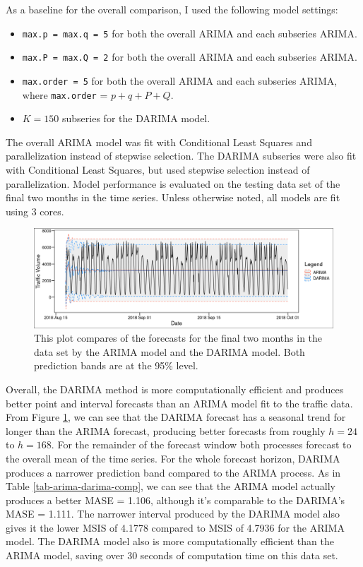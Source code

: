 \documentclass[
]{article}
\begin{document}
As a baseline for the overall comparison, I used the following model settings:
\begin{itemize}
  \item \texttt{max.p = max.q = 5} for both the overall ARIMA and each subseries ARIMA.
  \item \texttt{max.P = max.Q = 2} for both the overall ARIMA and each subseries ARIMA.
  \item \texttt{max.order = 5} for both the overall ARIMA and each subseries ARIMA, where \texttt{max.order} = $p + q + P + Q$.
  \item $K = 150$ subseries for the DARIMA model.
\end{itemize}
The overall ARIMA model was fit with Conditional Least Squares and parallelization instead of stepwise selection. The DARIMA subseries were also fit with Conditional Least Squares, but used stepwise selection instead of parallelization. Model performance is evaluated on the testing data set of the final two months in the time series. Unless otherwise noted, all models are fit using 3 cores.

\begin{figure}[ht]
  \begin{center}
    \includegraphics{Plots/arima_darima_forecast.png}
    \caption{This plot compares of the forecasts for the final two months in the data set by the ARIMA model and the DARIMA model. Both prediction bands are at the 95\% level.}
    \label{fig_arima_darima_frct}
  \end{center}
\end{figure}

Overall, the DARIMA method is more computationally efficient and produces better point and interval forecasts than an ARIMA model fit to the traffic data. From Figure \ref{fig_arima_darima_frct}, we can see that the DARIMA forecast has a seasonal trend for longer than the ARIMA forecast, producing better forecasts from roughly $h = 24$ to $h = 168$. For the remainder of the forecast window both processes forecast to the overall mean of the time series. For the whole forecast horizon, DARIMA produces a narrower prediction band compared to the ARIMA process. As in Table \ref{tab-arima-darima-comp}, we can see that the ARIMA model actually produces a better MASE = 1.106, although it's comparable to the DARIMA's MASE = 1.111. The narrower interval produced by the DARIMA model also gives it the lower MSIS of 4.1778 compared to MSIS of 4.7936 for the ARIMA model. The DARIMA model also is more computationally efficient than the ARIMA model, saving over 30 seconds of computation time on this data set. 
\end{document}
